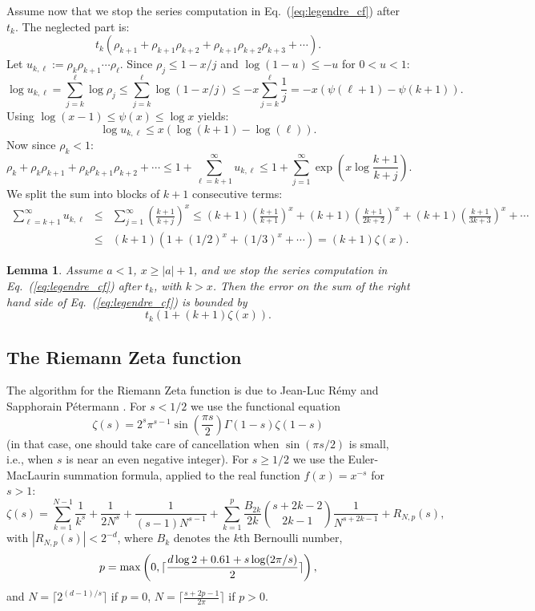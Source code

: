 \documentclass[12pt]{amsart}
\newtheorem{lemma}{Lemma}
\begin{document}
Assume now that we stop the series computation in Eq.~(\ref{eq:legendre_cf})
after $t_k$. The neglected part is:
\[ t_k (\rho_{k+1} + \rho_{k+1} \rho_{k+2} + \rho_{k+1} \rho_{k+2} \rho_{k+3}
   + \cdots). \]
Let $u_{k,\ell} := \rho_{k} \rho_{k+1} \cdots \rho_{\ell}$.
Since $\rho_j \leq 1 - x/j$ and $\log(1-u) \leq -u$ for $0 < u < 1$:
\[ \log u_{k,\ell} = \sum_{j=k}^{\ell} \log \rho_j
   \leq \sum_{j=k}^{\ell} \log (1-x/j)
   \leq -x \sum_{j=k}^{\ell} \frac{1}{j}
   = -x (\psi(\ell+1) - \psi(k+1)). \]
Using $\log(x-1) \leq \psi(x) \leq \log x$ yields:
\[ \log u_{k,\ell} \leq x (\log(k+1) - \log(\ell)). \]
Now since $\rho_k < 1$:
\[ \rho_k + \rho_k \rho_{k+1} + \rho_k \rho_{k+1} \rho_{k+2} + \cdots
   \leq 1 + \sum_{\ell=k+1}^{\infty} u_{k,\ell}
   \leq 1 + \sum_{j=1}^{\infty} \exp(x \log\frac{k+1}{k+j}). \]
We split the sum into blocks of $k+1$ consecutive terms:
\begin{eqnarray*}
\sum_{\ell=k+1}^{\infty} u_{k,\ell}
   &\leq& \sum_{j=1}^{\infty} \left( \frac{k+1}{k+j} \right)^x
   \leq (k+1) \left( \frac{k+1}{k+1} \right)^x
   + (k+1) \left( \frac{k+1}{2k+2} \right)^x
   + (k+1) \left( \frac{k+1}{3k+3} \right)^x + \cdots \\
   &\leq& (k+1) (1 + (1/2)^x + (1/3)^x + \cdots) = (k+1) \zeta(x).
\end{eqnarray*}

\begin{lemma}
Assume $a < 1$, $x \geq |a| + 1$,
and we stop the series computation in Eq.~(\ref{eq:legendre_cf})
after $t_k$, with $k > x$. Then the error on the sum of the right hand side
of Eq.~(\ref{eq:legendre_cf}) is bounded by
\[ t_k (1 + (k+1) \zeta(x)). \]
\end{lemma}

\subsection{The Riemann Zeta function}

The algorithm for the Riemann Zeta function is due to Jean-Luc R\'emy
and Sapphorain P\'etermann \cite{PeRe06,PeRe07}. For $s < 1/2$ we use the
functional equation
\[ \zeta(s) = 2^s \pi^{s-1} \sin\left(\frac{\pi s}{2}\right) \Gamma(1-s)
   \zeta(1-s) \]
(in that case, one should take care of cancellation when $\sin(\pi s/2)$ is
small, i.e., when $s$ is near an even negative integer).
For $s \geq 1/2$ we use the Euler-MacLaurin summation formula, applied
to the real function $f(x) = x^{-s}$ for $s > 1$:
\[ \zeta(s) = \sum_{k=1}^{N-1} \frac{1}{k^s} + \frac{1}{2N^s}
+ \frac{1}{(s-1)N^{s-1}} + \sum_{k=1}^p \frac{B_{2k}}{2k}
{s+2k-2 \choose 2k-1} \frac{1}{N^{s+2k-1}} + R_{N,p}(s), \]
with $|R_{N,p}(s)| < 2^{-d}$, where $B_k$ denotes the $k$th Bernoulli
number,
\[ p = {\rm max}\left( 0, \lceil \frac{d \log 2 + 0.61 + s \log(2\pi/s)}{2}
\rceil \right), \]
and $N = \lceil 2^{(d-1)/s} \rceil$ if $p=0$,
$N = \lceil \frac{s+2p-1}{2\pi} \rceil$ if $p > 0$.
\end{document}

